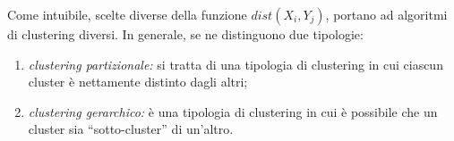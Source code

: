 \documentclass{subfiles}
\begin{document}
Come intuibile, scelte diverse della funzione $dist\left(X_{i}, Y_{j}\right)$, portano ad algoritmi di clustering diversi.
In generale, se ne distinguono due tipologie:
\begin{enumerate}
    \item \emph{clustering partizionale:} si tratta di una tipologia di clustering in cui ciascun cluster è nettamente distinto dagli altri;
    \item \emph{clustering gerarchico:} è una tipologia di clustering in cui è possibile che un cluster sia ``sotto-cluster'' di un'altro.
\end{enumerate}
\end{document}
